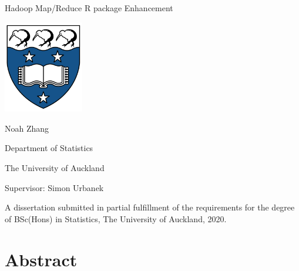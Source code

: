 \documentclass[11pt]{book}
\begin{document}
\pagestyle{empty}


\begin{center}

\vspace{1cm}

{\Huge         Hadoop Map/Reduce R package Enhancement}

\vspace{25mm} 

\includegraphics[width=3.5cm]{logo}

 \vspace{35mm}

{\Large       Noah Zhang}

	\vspace{1ex}

Department of Statistics

The University of Auckland

	\vspace{5ex}

Supervisor:             Simon Urbanek

	\vspace{30mm}

A dissertation submitted in partial fulfillment of the requirements for the degree of BSc(Hons) in Statistics, The University of Auckland, 2020.

\end{center}

\newpage


\chapter*{Abstract}       
\setcounter{page}{1}
\pagestyle{headings}
\end{document}
